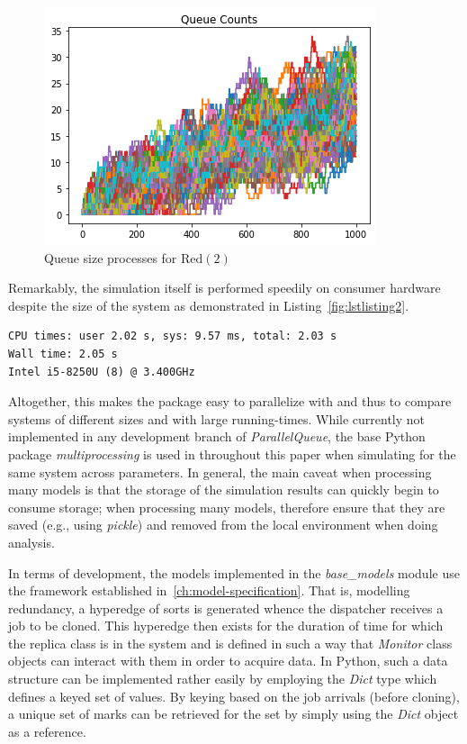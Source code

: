 \begin{figure}
    \centering
    \includegraphics[scale=0.8]{redundancy}
    \caption{Queue size processes for $\text{Red}(2)$}
    \label{fig:redpic}

    \medskip
\end{figure}

Remarkably, the simulation itself is performed speedily on consumer hardware despite the size of the system as demonstrated in Listing~\ref{fig:lstlisting2}.
\begin{lstlisting}[label={fig:lstlisting2},style=mystyle, caption={Runtime Statistics Using the Master ParallelQueue Branch}]
CPU times: user 2.02 s, sys: 9.57 ms, total: 2.03 s
Wall time: 2.05 s
Intel i5-8250U (8) @ 3.400GHz
\end{lstlisting}


Altogether, this makes the package easy to parallelize with and thus to compare systems of different sizes
and with large running-times.
While currently not implemented in any development branch of \textit{ParallelQueue}, the base Python package
\textit{multiprocessing} is used in throughout this paper when simulating for the same system across parameters.
In general, the main caveat when processing many models is that the storage of the simulation results can quickly begin
to consume storage;
when processing many models, therefore ensure that they are saved (e.g., using \textit{pickle}) and removed from
the local environment when doing analysis.

In terms of development, the models implemented in the \textit{base\_models} module use the framework established in~\ref{ch:model-specification}.
That is, modelling redundancy, a hyperedge of sorts is generated whence the dispatcher
receives a job to be cloned.
This hyperedge then exists for the duration of time for which the replica class is in the system and is defined in such
a way that \textit{Monitor} class objects can interact with them in order to acquire data.
In Python, such a data structure can be implemented rather easily by employing the \textit{Dict} type which defines
a keyed set of values.
By keying based on the job arrivals (before cloning), a unique set of marks can be retrieved for the set by simply using
the \textit{Dict} object as a reference.

